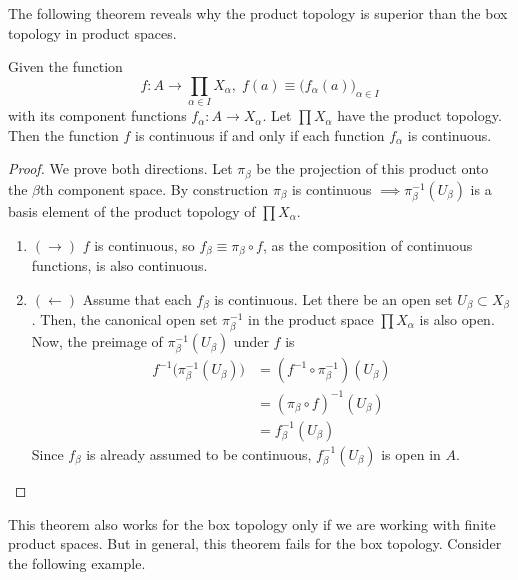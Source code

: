   The following theorem reveals why the product topology is superior than the box topology in product spaces. 

  \begin{theorem}
    Given the function 
    \begin{equation}
      f: A \rightarrow \prod_{\alpha \in I} X_\alpha, \; f(a) \equiv \big( f_\alpha (a) \big)_{\alpha \in I}
    \end{equation}
    with its component functions $f_\alpha: A \rightarrow X_\alpha$. Let $\prod X_\alpha$ have the product topology. Then the function $f$ is continuous if and only if each function $f_\alpha$ is continuous. 
  \end{theorem}
  \begin{proof}
    We prove both directions. Let $\pi_\beta$ be the projection of this product onto the $\beta$th component space. By construction $\pi_\beta$ is continuous $\implies \pi_\beta^{-1} (U_\beta)$ is a basis element of the product topology of $\prod X_\alpha$. 
    \begin{enumerate}
      \item $(\rightarrow)$ $f$ is continuous, so $f_\beta \equiv \pi_\beta \circ f$, as the composition of continuous functions, is also continuous. 
      \item $(\leftarrow)$ Assume that each $f_\beta$ is continuous. Let there be an open set $U_\beta \subset X_\beta$. Then, the canonical open set $\pi_\beta^{-1}$ in the product space $\prod X_\alpha$ is also open. Now, the preimage of $\pi_\beta^{-1} (U_\beta)$ under $f$ is 
      \begin{align*}
        f^{-1} \big( \pi_\beta^{-1} (U_\beta)\big) & = (f^{-1} \circ \pi_\beta^{-1})(U_\beta) \\
        & = (\pi_\beta \circ f)^{-1} (U_\beta) \\
        & = f_\beta^{-1} (U_\beta)
      \end{align*}
      Since $f_\beta$ is already assumed to be continuous, $f_\beta^{-1} (U_\beta)$ is open in $A$. 
    \end{enumerate}
  \end{proof} 

  This theorem also works for the box topology only if we are working with finite product spaces. But in general, this theorem fails for the box topology. Consider the following example. 

